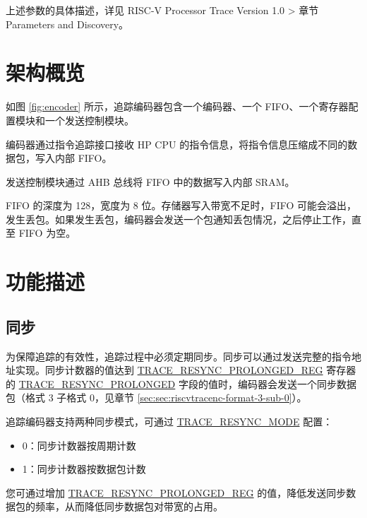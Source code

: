 \documentclass[main\_\_CN.tex]{subfiles}
\begin{document}
上述参数的具体描述，详见 RISC-V Processor Trace Version 1.0 > 章节 Parameters and Discovery。


\section{架构概览}
\label{sec:riscvtracenc-arch-overview}


如图 \ref{fig:encoder} 所示，追踪编码器包含一个编码器、一个 FIFO、一个寄存器配置模块和一个发送控制模块。

编码器通过指令追踪接口接收 HP CPU 的指令信息，将指令信息压缩成不同的数据包，写入内部 FIFO。

发送控制模块通过 AHB 总线将 FIFO 中的数据写入内部 SRAM。

FIFO 的深度为 128，宽度为 8 位。存储器写入带宽不足时，FIFO 可能会溢出，发生丢包。如果发生丢包，编码器会发送一个包通知丢包情况，之后停止工作，直至 FIFO 为空。


\section{功能描述}
\label{sec:riscvtracenc-func-desc}

\subsection{同步}

为保障追踪的有效性，追踪过程中必须定期同步。同步可以通过发送完整的指令地址实现。同步计数器的值达到 \hyperref[regdesc:TRACERESYNCPROLONGEDREG] {TRACE\_RESYNC\_PROLONGED\_REG} 寄存器的 \hyperref[fielddesc:TRACERESYNCPROLONGED]{TRACE\_RESYNC\_PROLONGED} 字段的值时，编码器会发送一个同步数据包（格式 3 子格式 0，见章节 \ref{sec:sec:riscvtracenc-format-3-sub-0}）。

追踪编码器支持两种同步模式，可通过 \hyperref[fielddesc:TRACERESYNCMODE]{TRACE\_RESYNC\_MODE} 配置：
\begin{itemize}
    \item 0：同步计数器按周期计数
    \item 1：同步计数器按数据包计数
\end{itemize}

您可通过增加 \hyperref[regdesc:TRACERESYNCPROLONGEDREG]{TRACE\_RESYNC\_PROLONGED\_REG} 的值，降低发送同步数据包的频率，从而降低同步数据包对带宽的占用。
\end{document}
